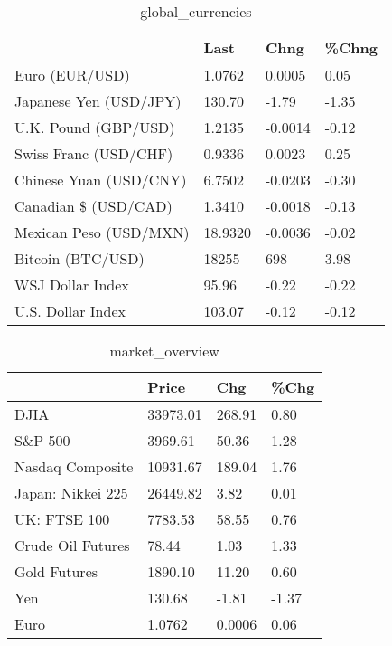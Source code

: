 \documentclass{article}%
\begin{document}
%


\begin{table}[htbp]%
\caption{global\_currencies}%
\centering%
\begin{adjustbox}{width=1\textwidth}%
\begin{tabular}{llll}
\toprule
                       &    Last &    Chng & \%Chng \\
\midrule
        Euro (EUR/USD) &  1.0762 &  0.0005 &  0.05 \\
Japanese Yen (USD/JPY) &  130.70 &   -1.79 & -1.35 \\
  U.K. Pound (GBP/USD) &  1.2135 & -0.0014 & -0.12 \\
 Swiss Franc (USD/CHF) &  0.9336 &  0.0023 &  0.25 \\
Chinese Yuan (USD/CNY) &  6.7502 & -0.0203 & -0.30 \\
  Canadian \$ (USD/CAD) &  1.3410 & -0.0018 & -0.13 \\
Mexican Peso (USD/MXN) & 18.9320 & -0.0036 & -0.02 \\
     Bitcoin (BTC/USD) &   18255 &     698 &  3.98 \\
      WSJ Dollar Index &   95.96 &   -0.22 & -0.22 \\
     U.S. Dollar Index &  103.07 &   -0.12 & -0.12 \\
\bottomrule
\end{tabular}
%
\end{adjustbox}%
\end{table}

%


\begin{table}[htbp]%
\caption{market\_overview}%
\centering%
\begin{adjustbox}{width=1\textwidth}%
\begin{tabular}{llll}
\toprule
                  &    Price &    Chg &  \%Chg \\
\midrule
             DJIA & 33973.01 & 268.91 &  0.80 \\
          S\&P 500 &  3969.61 &  50.36 &  1.28 \\
 Nasdaq Composite & 10931.67 & 189.04 &  1.76 \\
Japan: Nikkei 225 & 26449.82 &   3.82 &  0.01 \\
     UK: FTSE 100 &  7783.53 &  58.55 &  0.76 \\
Crude Oil Futures &    78.44 &   1.03 &  1.33 \\
     Gold Futures &  1890.10 &  11.20 &  0.60 \\
              Yen &   130.68 &  -1.81 & -1.37 \\
             Euro &   1.0762 & 0.0006 &  0.06 \\
\bottomrule
\end{tabular}
%
\end{adjustbox}%
\end{table}

%
\end{document}
